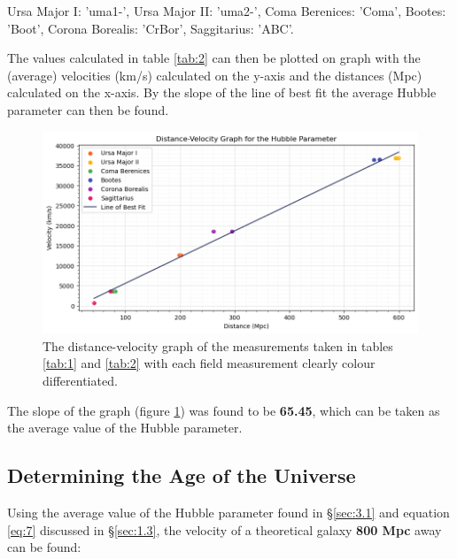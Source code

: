 \documentclass[12pt]{article}
\begin{document}
\begin{table}[H]
{    }

    \caption{\centering \footnotesize{Results calculated from the values gathered in table \protect\ref{tab:1} for each field:}}
    \footnotesize{Ursa Major I: 'uma1-', Ursa Major II: 'uma2-', Coma Berenices: 'Coma', Bootes: 'Boot', Corona Borealis: 'CrBor', Saggitarius: 'ABC'.}
    \label{tab:2}

\end{table}

The values calculated in table \ref{tab:2} can then be plotted on graph with the (average) velocities (km/s) calculated on the y-axis and the distances (Mpc) calculated
on the x-axis. By the slope of the line of best fit the average Hubble parameter can then be found.

\begin{figure}[H]
    \centering
    \includegraphics[width=\textwidth]{HUBBLEgraph.png}
    \caption{\centering \footnotesize{The distance-velocity graph of the measurements taken in tables \protect\ref{tab:1} and \protect\ref{tab:2} with each field measurement clearly colour differentiated.}}
    \label{fig:graph}
\end{figure}

The slope of the graph (figure \ref{fig:graph}) was found to be \textbf{65.45}, which can be taken as the average value of the Hubble parameter.

\newpage

\subsection{Determining the Age of the Universe} \label{sec:3.2}

Using the average value of the Hubble parameter found in §\ref{sec:3.1} and equation \ref{eq:7} discussed in §\ref{sec:1.3}, the velocity of
a theoretical galaxy \textbf{800 Mpc} away can be found:
\end{document}

